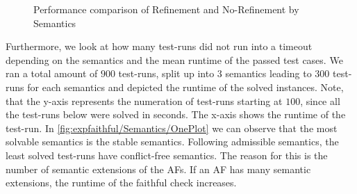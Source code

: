 \begin{figure}[H]
    \centering
    \caption{Performance comparison of Refinement and No-Refinement by Semantics}
    \label{fig:expfaithful/REFvsNOREF/OnePlot}
\end{figure}


Furthermore, we look at how many test-runs did not run into a timeout depending on the semantics and the mean runtime of the passed test cases. We ran a total amount of $900$ test-runs, split up into $3$ semantics leading to $300$ test-runs for each semantics and depicted the runtime of the solved instances. Note, that the y-axis represents the numeration of test-runs starting at $100$, since all the test-runs below were solved in seconds. The x-axis shows the runtime of the test-run. In \cref{fig:expfaithful/Semantics/OnePlot} we can observe that the most solvable semantics is the stable semantics. Following admissible semantics, the least solved test-runs have conflict-free semantics. The reason for this is the number of semantic extensions of the AFs. If an AF has many semantic extensions, the runtime of the faithful check increases.


